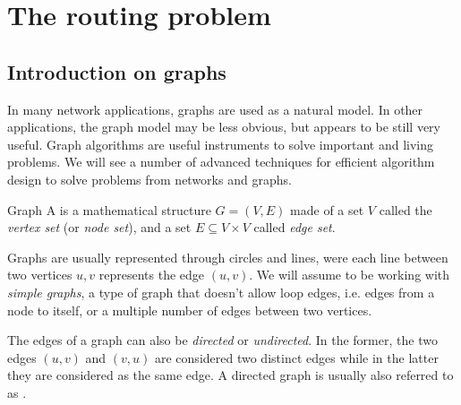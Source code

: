 \documentclass[a4paper, 12pt]{report}
\institute{\curlyquotes{\hspace{0.25mm}Sapienza} Università di Roma}
\subtitle{Appunti integrati con il libro \book}
\author{\textit{Autore}\\\authorName}
\institute{\curlyquotes{\hspace{0.25mm}Sapienza} University of Rome}
\subtitle{Lecture notes integrated with the book \book}
\author{\textit{Author}\\\authorName}
\title{\courseName}
\date{\today}
\begin{document}
    \maketitle

    {
        \hypersetup{allcolors=black}

        \romantableofcontents
    }

    \introduction


    \chapter{The routing problem}

    \section{Introduction on graphs}

    In many network applications, graphs are used as a natural model. In other applications, the graph model may be less obvious, but appears to be still very useful. Graph algorithms are useful instruments to solve important and living problems. We will see a number of advanced techniques for efficient algorithm design to solve problems from networks and graphs. 

    \begin{frameddefn}{Graph}
        A  is a mathematical structure $G = (V,E)$ made of a set $V$ called the \textit{vertex set} (or \textit{node set}), and a set $E \subseteq V \times V$ called \textit{edge set}.
    \end{frameddefn}

    Graphs are usually represented through circles and lines, were each line between two vertices $u,v$ represents the edge $(u,v)$. We will assume to be working with \textit{simple graphs}, a type of graph that doesn't allow loop edges, i.e. edges from a node to itself, or a multiple number of edges between two vertices.  
   

    The edges of a graph can also be \textit{directed} or \textit{undirected}. In the former, the two edges $(u,v)$ and $(v,u)$ are considered two distinct edges while in the latter they are considered as the same edge. A directed graph is usually also referred to as . 
    
\end{document}
